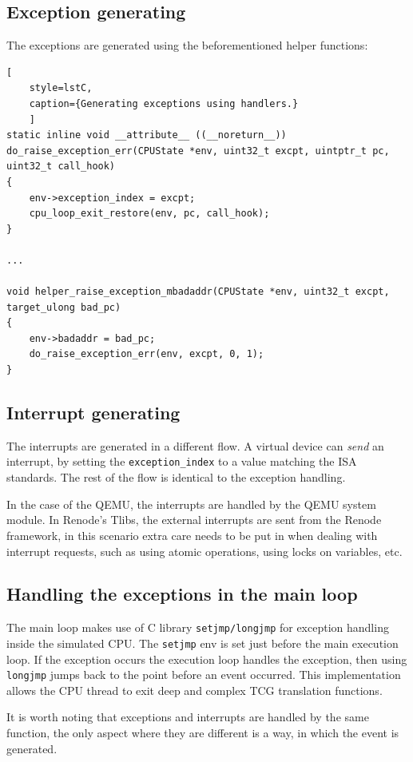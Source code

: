 \pagebreak
\subsection*{Exception generating}
The exceptions are generated using the beforementioned helper functions:

\begin{lstlisting}[
    style=lstC,
    caption={Generating exceptions using handlers.}
    ]
static inline void __attribute__ ((__noreturn__))
do_raise_exception_err(CPUState *env, uint32_t excpt, uintptr_t pc, uint32_t call_hook)
{
    env->exception_index = excpt;
    cpu_loop_exit_restore(env, pc, call_hook);
}

...

void helper_raise_exception_mbadaddr(CPUState *env, uint32_t excpt, target_ulong bad_pc)
{
    env->badaddr = bad_pc;
    do_raise_exception_err(env, excpt, 0, 1);
}
\end{lstlisting}

\subsection*{Interrupt generating}
The interrupts are generated in a different flow. A virtual device can \textit{send} an interrupt, by setting the
\texttt{exception\_index} to a value matching the ISA standards. The rest of the flow is identical to the exception
handling.

In the case of the QEMU, the interrupts are handled by the QEMU system module. In Renode's Tlibs, the external
interrupts are sent from the Renode framework, in this scenario extra care needs to be put in when dealing with
interrupt requests, such as using atomic operations, using locks on variables, etc.

\subsection*{Handling the exceptions in the main loop}

The main loop makes use of C library \texttt{setjmp/longjmp} for exception handling inside the simulated CPU.
The \texttt{setjmp} env is set just before the main execution loop. If the exception occurs the execution loop handles
the exception, then using \texttt{longjmp} jumps back to the point before an event occurred. This implementation allows
the CPU thread to exit deep and complex TCG translation functions.

It is worth noting that exceptions and interrupts are handled by the same function, the only aspect where they are
different is a way, in which the event is generated.

